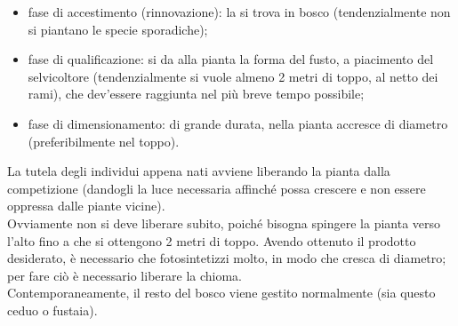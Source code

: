 \begin{itemize}[nosep]
    \item fase di accestimento (rinnovazione): la si trova in bosco (tendenzialmente non si piantano le specie sporadiche);
    \item fase di qualificazione: si da alla pianta la forma del fusto, a piacimento del selvicoltore (tendenzialmente si vuole almeno 2 metri di toppo, al netto dei rami), che dev'essere raggiunta nel più breve tempo possibile;
    \item fase di dimensionamento: di grande durata, nella pianta accresce di diametro (preferibilmente nel toppo).
\end{itemize} 
La tutela degli individui appena nati avviene liberando la pianta dalla competizione (dandogli la luce necessaria affinché possa crescere e non essere oppressa dalle piante vicine).\\
Ovviamente non si deve liberare subito, poiché bisogna spingere la pianta verso l'alto fino a che si ottengono 2 metri di toppo. Avendo ottenuto il prodotto desiderato, è necessario che fotosintetizzi molto, in modo che cresca di diametro; per fare ciò è necessario liberare la chioma.\\
Contemporaneamente, il resto del bosco viene gestito normalmente (sia questo ceduo o fustaia).
